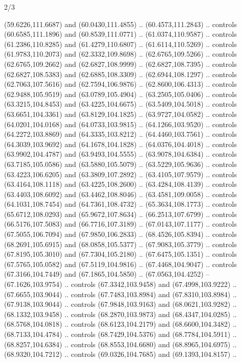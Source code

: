 \begin{flagdescription}{2/3}
\begin{scope}[shift={(0.5\flaglength,0.5)},scale=\flagwidth/320]
\begin{scope}[y=0.8pt, x=0.8pt, yscale=-1,shift={(-118.3,-146)}]
  (59.6226,111.6687) and (60.0430,111.4855) .. (60.4573,111.2843) .. controls
  (60.6585,111.1896) and (60.8539,111.0771) .. (61.0374,110.9587) .. controls
  (61.2386,110.8285) and (61.4279,110.6807) .. (61.6114,110.5269) .. controls
  (61.9783,110.2073) and (62.3332,109.8698) .. (62.6765,109.5266) .. controls
  (62.6765,109.2662) and (62.6827,108.9999) .. (62.6827,108.7395) .. controls
  (62.6827,108.5383) and (62.6885,108.3309) .. (62.6944,108.1297) .. controls
  (62.7063,107.5616) and (62.7594,106.9876) .. (62.8600,106.4313) .. controls
  (62.9488,105.9519) and (63.0789,105.4904) .. (63.2505,105.0406) .. controls
  (63.3215,104.8453) and (63.4225,104.6675) .. (63.5409,104.5018) .. controls
  (63.6651,104.3361) and (63.8129,104.1825) .. (63.9727,104.0582) .. controls
  (64.0201,104.0168) and (64.0733,103.9815) .. (64.1266,103.9520) .. controls
  (64.2272,103.8869) and (64.3335,103.8212) .. (64.4460,103.7561) .. controls
  (64.3039,103.9692) and (64.1678,104.1828) .. (64.0376,104.4018) .. controls
  (63.9902,104.4787) and (63.9493,104.5555) .. (63.9078,104.6384) .. controls
  (63.7185,105.0586) and (63.5880,105.5079) .. (63.5229,105.9636) .. controls
  (63.4223,106.6205) and (63.3809,107.2892) .. (63.4105,107.9579) .. controls
  (63.4164,108.1118) and (63.4225,108.2600) .. (63.4284,108.4139) .. controls
  (63.4403,108.6092) and (63.4462,108.8046) .. (63.4581,109.0058) .. controls
  (64.1031,108.7454) and (64.7361,108.4732) .. (65.3634,108.1773) .. controls
  (65.6712,108.0293) and (65.9672,107.8634) .. (66.2513,107.6799) .. controls
  (66.5176,107.5083) and (66.7716,107.3189) .. (67.0143,107.1177) .. controls
  (67.5055,106.7094) and (67.9850,106.2833) .. (68.4526,105.8394) .. controls
  (68.2691,105.6915) and (68.0858,105.5377) .. (67.9083,105.3779) .. controls
  (67.8195,105.3010) and (67.7304,105.2180) .. (67.6475,105.1351) .. controls
  (67.5765,105.0582) and (67.5119,104.9816) .. (67.4468,104.9047) .. controls
  (67.3166,104.7449) and (67.1865,104.5850) .. (67.0563,104.4252) --
  (67.1626,103.9754) .. controls (67.3342,103.9458) and (67.4998,103.9222) ..
  (67.6655,103.9044) .. controls (67.7483,103.8984) and (67.8310,103.8984) ..
  (67.9138,103.9044) .. controls (67.9848,103.9163) and (68.0621,103.9282) ..
  (68.1332,103.9458) .. controls (68.2870,103.9873) and (68.4347,104.0285) ..
  (68.5768,104.0818) .. controls (68.6123,104.2179) and (68.6600,104.3482) ..
  (68.7133,104.4784) .. controls (68.7429,104.5376) and (68.7784,104.5911) ..
  (68.8257,104.6384) .. controls (68.8553,104.6680) and (68.8965,104.6975) ..
  (68.9320,104.7212) .. controls (69.0326,104.7685) and (69.1393,104.8157) ..

\end{scope}
\end{scope}
\end{flagdescription}
